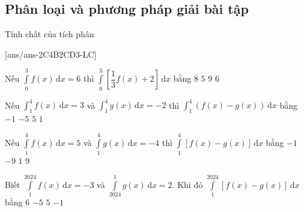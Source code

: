\subsection{Phân loại và phương pháp giải bài tập}
\begin{dang}{Tính chất của tích phân}

\end{dang}
\setcounter{ex}{0}
\TN
{}[ans/ans-2C4B2CD3-LC]
\begin{ex}%
	Nếu $\displaystyle\int\limits_0^3f(x)\mathrm{\,d}x=6$ thì $\displaystyle\int\limits_0^3\left[\dfrac{1}{3}f(x)+2\right]\mathrm{\,d}x$ bằng
	\choice
	{\True $8$}
	{$5$}
	{$9$}
	{$6$}
\end{ex}
\begin{ex}%
	Nếu $\displaystyle\int_1^4 f(x) \mathrm{\,d}x=3$ và $\displaystyle\int_1^4 g(x) \mathrm{\,d}x=-2$ thì $\displaystyle\int_1^4\left(f(x)-g(x)\right)\mathrm{\,d}x$ bằng
	\choice
	{$-1$}
	{$-5$}
	{\True $5$}
	{$1$}
\end{ex}
\begin{ex}%
	Nếu $\displaystyle\int\limits_1^4f(x)\mathrm{\,d}x=5$ và $\displaystyle\int\limits_1^4g(x)\mathrm{\,d}x=-4$ thì $\displaystyle\int\limits_1^4\left[f(x)-g(x)\right]\mathrm{\,d}x$ bằng
	\choice
	{$-1$}
	{$-9$}
	{$1$}
	{\True $9$}
\end{ex}
\begin{ex}%
	Biết $\displaystyle\int\limits_1^{2024}f(x)\mathrm{\,d}x=-3$ và $\displaystyle\int\limits_{2024}^1g(x)\mathrm{\,d}x=2$. Khi đó $\displaystyle\int\limits_1^{2024}\left[f(x)-g(x)\right]\mathrm{\,d}x$ bằng
	\choice
	{$6$}
	{$-5$}
	{$5$}
	{\True $-1$}
\end{ex}
